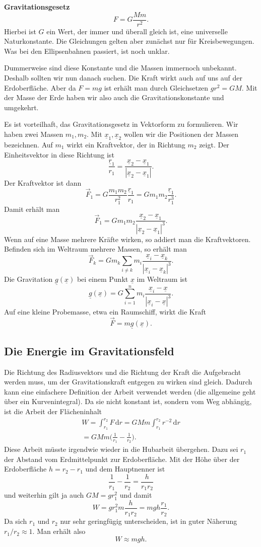 \documentclass[a4paper,10pt,fleqn,twocolumn,twoside]{article}
\begin{document}
\textbf{Gravitationsgesetz}
\[F = G \frac{Mm}{r^2}.\]
Hierbei ist \(G\) ein Wert, der immer und überall gleich ist, eine
universelle Naturkonstante. Die Gleichungen gelten aber zunächst
nur für Kreisbewegungen. Was bei den Ellipsenbahnen passiert,
ist noch unklar.

Dummerweise sind diese Konstante und die Massen immernoch unbekannt.
Deshalb sollten wir nun danach suchen. Die Kraft wirkt auch auf
uns auf der Erdoberfläche. Aber da \(F=mg\) ist erhält man durch
Gleichsetzen \(gr^2=GM\). Mit der Masse der Erde haben wir also auch
die Gravitationskonstante und umgekehrt.

Es ist vorteilhaft, das Gravitationsgesetz in Vektorform zu
formulieren. Wir haben zwei Massen \(m_1, m_2\).
Mit \(\underline x_1, \underline x_2\) wollen wir die Positionen
der Massen bezeichnen. Auf \(m_1\) wirkt ein Kraftvektor, der in
Richtung \(m_2\) zeigt. Der Einheitsvektor in diese Richtung ist
\[\frac{\underline r_1}{r_1} = \frac{\underline x_2-\underline x_1}
{|\underline x_2-\underline x_1|}.\]
Der Kraftvektor ist dann
\[\vec F_1 = G \frac{m_1m_2}{r_1^2}\frac{\underline r_1}{r_1}
= Gm_1m_2\frac{\underline r_1}{r_1^3}.\]
Damit erhält man
\[\vec F_1 = Gm_1m_2\frac{\underline x_2-\underline x_1}
{|\underline x_2-\underline x_1|^3}.\]
Wenn auf eine Masse mehrere Kräfte wirken, so addiert man die
Kraftvektoren. Befinden sich im Weltraum mehrere Massen,
so erhält man
\[\vec F_k = Gm_k\sum_{i\ne k}m_i\frac{\underline x_i-\underline x_k}
{|\underline x_i-\underline x_k|^3}.\]
Die Gravitation \(\underline g(\underline x)\) bei einem
Punkt \(\underline x\) im Weltraum ist
\[\underline g(\underline x)
= G\sum_{i=1}^n m_i\frac{\underline x_i-\underline x}
{|\underline x_i-\underline x|^3}.\]
Auf eine kleine Probemasse, etwa ein Raumschiff, wirkt die Kraft
\[\vec F = m\underline g(\underline x).\]

\subsection{Die Energie im Gravitationsfeld}

Die Richtung des Radiusvektors und die Richtung der Kraft die
Aufgebracht werden muss, um der Gravitationskraft entgegen zu wirken
sind gleich. Dadurch kann eine einfachere Definition der Arbeit
verwendet werden (die allgemeine geht über ein Kurvenintegral). Da
sie nicht konstant ist, sondern vom Weg abhängig, ist die Arbeit der
Flächeninhalt
\begin{gather*}
W = \int_{r_1}^{r_2} F\,\mathrm dr
= GMm\int_{r_1}^{r_2} r^{-2}\,\mathrm dr\\
= GMm\Big(\frac{1}{r_1}-\frac{1}{r_2}\Big).
\end{gather*}
Diese Arbeit müsste irgendwie wieder in die Hubarbeit übergehen.
Dazu sei \(r_1\) der Abstand vom Erdmittelpunkt zur Erdoberfläche.
Mit der Höhe über der Erdoberfläche \(h=r_2-r_1\)
und dem Hauptnenner ist
\[\frac{1}{r_1}-\frac{1}{r_2} = \frac{h}{r_1r_2}\]
und weiterhin gilt ja auch \(GM=gr_1^2\) und damit
\[W = g{r_1^2}m \frac{h}{r_1r_2} = mgh\frac{r_1}{r_2}.\]
Da sich \(r_1\) und \(r_2\) nur sehr geringfügig unterscheiden,
ist in guter Näherung \(r_1/r_2\approx 1\). Man erhält also
\[W \approx mgh.\]
\end{document}
